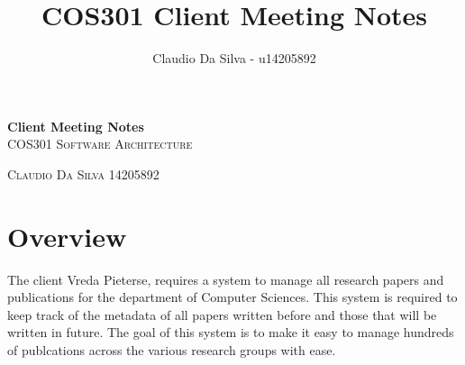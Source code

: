 \documentclass[a4paper]{article}
\title{COS301 Client Meeting Notes}
\author{Claudio Da Silva - u14205892}
\begin{document}
\begin{titlepage}
	\begin{center}
		\huge{\bfseries Client Meeting Notes}\\
		[2mm]
		\textsc{\large COS301 Software Architecture}\\
		[7.5mm]
	\end{center}
	
	\begin{center}
		\textsc{\large Claudio Da Silva 14205892\\}
	\end{center}
\end{titlepage}


\section{Overview}

The client Vreda Pieterse, requires a system to manage all research papers and publications for the department of Computer Sciences. This system is required to keep track of the metadata of all papers written before and those that will be written in future. The goal of this system is to make it easy to manage hundreds of publcations across the various research groups with ease. 
\end{document}
